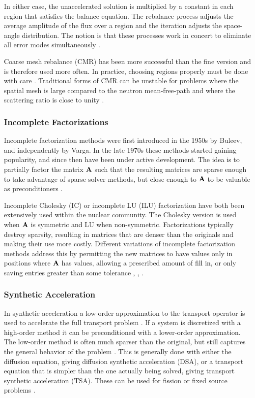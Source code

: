 In either case, the unaccelerated solution is multiplied by a constant in each region that satisfies the balance equation. The rebalance process adjusts the average amplitude of the flux over a region and the iteration adjusts the space-angle distribution. The notion is that these processes work in concert to eliminate all error modes simultaneously \cite{Adams2002}. 

Coarse mesh rebalance (CMR) has been more successful than the fine version and is therefore used more often. In practice, choosing regions properly must be done with care \cite{Lewis1993}. Traditional forms of CMR can be unstable for problems where the spatial mesh is large compared to the neutron mean-free-path and where the scattering ratio is close to unity \cite{Alcouffe1977}. 

\subsubsection{Incomplete Factorizations}
Incomplete factorization methods were first introduced in the 1950s by Buleev, and independently by Varga. In the late 1970s these methods started gaining popularity, and since then have been under active development. The idea is to partially factor the matrix $\mathbf{A}$ such that the resulting matrices are sparse enough to take advantage of sparse solver methods, but close enough to $\mathbf{A}$ to be valuable as preconditioners \cite{Benzi2002}.

Incomplete Cholesky (IC) or incomplete LU (ILU) factorization have both been extensively used within the nuclear community. The Cholesky version is used when $\mathbf{A}$ is symmetric and LU when non-symmetric. Factorizations typically destroy sparsity, resulting in matrices that are denser than the originals and making their use more costly. Different variations of incomplete factorization methods address this by permitting the new matrices to have values only in positions where $\mathbf{A}$ has values, allowing a prescribed amount of fill in, or only saving entries greater than some tolerance \cite{Trefethen1997}, \cite{Patton2002}, \cite{Oliveira1998}.

\subsubsection{Synthetic Acceleration}
In synthetic acceleration a low-order approximation to the transport operator is used to accelerate the full transport problem \cite{Lewis1993}. If a system is discretized with a high-order method it can be preconditioned with a lower-order approximation. The low-order method is often much sparser than the original, but still captures the general behavior of the problem \cite{Trefethen1997}. This is generally done with either the diffusion equation, giving diffusion synthetic acceleration (DSA), or a transport equation  that is simpler than the one actually being solved, giving transport synthetic acceleration (TSA). These can be used for fission or fixed source problems \cite{Adams2002}. 

